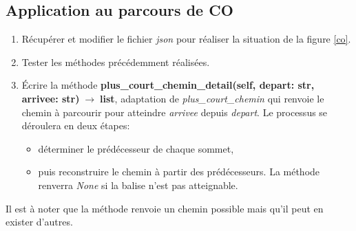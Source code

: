 \documentclass[a4paper,11pt]{article}
\begin{document}
\begin{Form}
\section{Application au parcours de CO}
\begin{activite}
\begin{enumerate}
\item Récupérer et modifier le fichier \emph{json} pour réaliser la situation de la figure \ref{co}.
\item Tester les méthodes précédemment réalisées.
\item Écrire la méthode \textbf{plus\_court\_chemin\_detail(self, depart: str, arrivee: str)$\;\rightarrow\;$list}, adaptation de \emph{plus\_court\_chemin} qui renvoie le chemin à parcourir pour atteindre \emph{arrivee} depuis \emph{depart}. Le processus se déroulera en deux étapes:
\begin{itemize}
\item déterminer le prédécesseur de chaque sommet,
\item puis reconstruire le chemin à partir des prédécesseurs. La méthode renverra \emph{None} si la balise n'est pas atteignable.
\end{itemize}
\end{enumerate}
Il est à noter que la méthode renvoie un chemin possible mais qu'il peut en exister d'autres.
\end{activite}
\end{Form}
\end{document}

